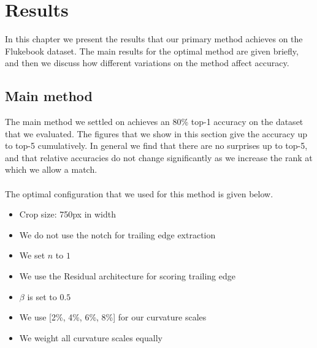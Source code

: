 

\chapter{Results} \label{sec:results}

In this chapter we present the results that our primary method achieves on the Flukebook dataset.
The main results for the optimal method are given briefly, and then we discuss how different variations on the method affect accuracy.

\section{Main method}

The main method we settled on achieves an 80\% top-1 accuracy on the dataset that we evaluated.  
The figures that we show in this section give the accuracy up to top-5 cumulatively.
In general we find that there are no surprises up to top-5, and that relative accuracies do not change significantly as we increase the rank at which we allow a match.
\\\\
The optimal configuration that we used for this method is given below.
\begin{itemize}
\item Crop size: 750px in width
\item We do not use the notch for trailing edge extraction
\item We set $n$ to $1$
\item We use the Residual architecture for scoring trailing edge
\item $\beta$ is set to $0.5$
\item We use [2\%, 4\%, 6\%, 8\%] for our curvature scales
\item We weight all curvature scales equally
\end{itemize}



